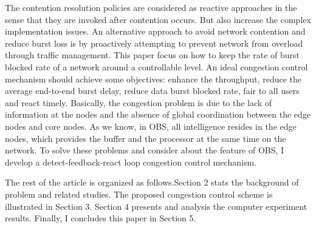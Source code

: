The contention resolution policies are considered as reactive
approaches in the sense that they are invoked after contention occurs.
But also increase the complex implementation issues. An alternative
approach to avoid network contention and reduce burst loss is by proactively
 attempting to prevent network from overload through traffic management. This
paper focus on how to keep the rate of burst blocked rate of a network 
around a controllable level. An ideal congestion control mechanism should
achieve some objectives: enhance the throughput, reduce the average end-to-end burst delay, reduce data burst blocked rate, fair to all users and react timely. Basically, the congestion problem is due to the lack of information at the nodes and the absence of global coordination between the edge nodes and core nodes. As we know, in OBS, all intelligence resides in the edge nodes, which provides the buffer and the processor at the same time on the network. To solve these problems and consider about the feature of OBS, I develop a detect-feedback-react loop congestion control mechanism. 

The rest of the article is organized as follows.Section 2 stats the background of problem 
and related studies. The proposed congestion control scheme is illustrated in Section 3. 
Section 4 presents and analysis the computer experiment results. Finally, I concludes this paper in Section 5.
